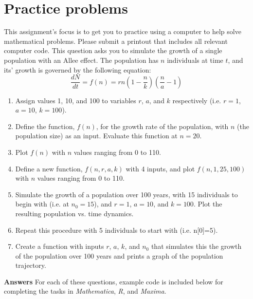 \documentclass[12pt]{article}
\newif\ifanswers
\begin{document}
\maketitle

\section{Practice problems}
\setcounter{equation}{0}
This assignment's focus is to get you to practice using a computer to help solve mathematical problems. Please submit a printout that includes all relevant computer code. This question asks you to simulate the growth of a single population with an Allee effect. The population has $n$ individuals at time $t$, and its' growth is governed by the following equation:
\begin{equation}
\frac{dN}{dt} = f(n) = rn(1-\frac{n}{k})(\frac{n}{a}-1)
\end{equation}

\begin{enumerate}[label=\alph*]
\item{} Assign values 1, 10, and 100 to variables $r$, $a$, and $k$ respectively (i.e. $r = 1$, $a = 10$, $k = 100$).
\item{} Define the function, $f(n)$, for the growth rate of the population, with $n$ (the population size) as an input. Evaluate this function at $n=20$.
\item{} Plot $f(n)$ with $n$ values ranging from 0 to 110.
\item{} Define a new function, $f(n, r, a, k)$ with 4 inputs, and plot $f(n,1, 25,100)$ with $n$ values ranging from 0 to 110.
\item{} Simulate the growth of a population over 100 years, with 15 individuals to begin with (i.e. at $n_{0}=15$), and $r = 1$, $a = 10$, and $k = 100$. Plot the resulting population vs. time dynamics.
\item{} Repeat this procedure with 5 individuals to start with (i.e. n[0]=5).
\item{} Create a function with inputs $r$, $a$, $k$, and $n_{0}$ that simulates this the growth of the population over 100 years and prints a graph of the population trajectory.
\end{enumerate}

\newpage
\ifanswers
\textbf{Answers}
For each of these questions, example code is included below for completing the tasks in \textit{Mathematica}, \textit{R}, and \textit{Maxima}.
\end{document}
